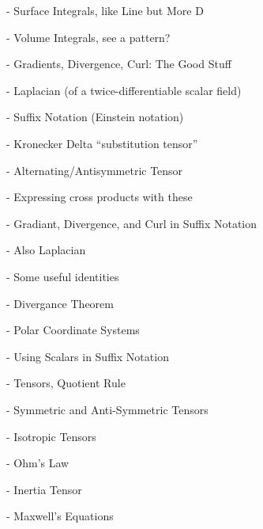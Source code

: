 - Surface Integrals, like Line but More D

- Volume Integrals, see a pattern?

- Gradients, Divergence, Curl: The Good Stuff

- Laplacian (of a twice-differentiable scalar field)

- Suffix Notation (Einstein notation)

- Kronecker Delta ``substitution tensor''

- Alternating/Antisymmetric Tensor

- Expressing cross products with these

- Gradiant, Divergence, and Curl in Suffix Notation

- Also Laplacian

- Some useful identities

- Divergance Theorem

- Polar Coordinate Systems

- Using Scalars in Suffix Notation

- Tensors, Quotient Rule

- Symmetric and Anti-Symmetric Tensors

- Isotropic Tensors

- Ohm's Law

- Inertia Tensor

- Maxwell's Equations

